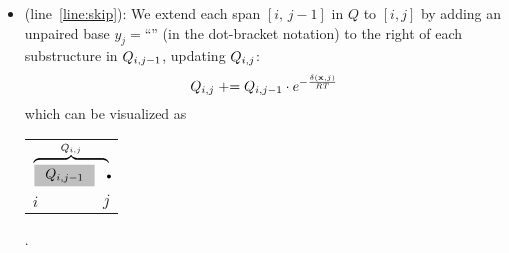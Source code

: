 \begin{itemize}


\item \nskip (line~\ref{line:skip}): We extend each %
span $[i,\,j\!-\!1]$ in $Q$ to $[i,j]$ %
by adding an unpaired base $y_j\!=$``\md'' (in the dot-bracket notation) to the right of each substructure in $Q_{{{i}}, {{j-1}}}$,
updating $Q_{{{i}}, {{j}}}$: %
\[
Q_{{{i}}, {{j}}} \mathrel{+}= Q_{{{i}}, {{j-1}}} \cdot e^{-\frac{\delta(\mathbf{x}, j)}{RT}}
\]
which can be visualized as
  \begin{tabular}{lr@{\,\quad}} %
    \multicolumn{2}{c}{
      $\overbrace{\myboxmath{\ \ \Qf{i}{j-1} \ \ } \ \Huge\md\!\!\!\!}^{\Qf{i}{j}}$
    }
    \\
    $i$ & $j$
  \end{tabular}.





\end{itemize}
